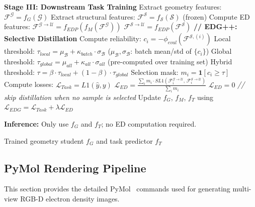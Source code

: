 \begin{algorithm}[!htb]
\begin{algorithmic}
   \STATE
   \STATE \textbf{Stage III: Downstream Task Training}
       \STATE Extract geometry features: $\mathcal{F}^{\mathcal{G}} = f_G(\mathcal{G})$
       \STATE Extract structural features: $\mathcal{F}^{\mathcal{S}} = f_{\mathcal{S}}(\mathcal{S})$ (frozen)
       \STATE Compute ED features: $\mathcal{F}^{\mathcal{G}\rightarrow\mathcal{U}} = f_{EDP}(f_M(\mathcal{F}^{\mathcal{G}}))$
       \STATE \quad\quad\quad\quad\quad\quad\quad $\mathcal{F}^{\mathcal{S}\rightarrow\mathcal{U}} = f_{EDP}(\mathcal{F}^{\mathcal{S}})$
       \STATE
       \STATE \textbf{// EDG++: Selective Distillation}
       \STATE Compute reliability: $c_i = -\phi_{eval}(\mathcal{F}^{\mathcal{S},(i)})$
       \STATE Local threshold: $\tau_{local} = \mu_{\mathcal{B}} + \kappa_{batch} \cdot \sigma_{\mathcal{B}}$ \quad ($\mu_{\mathcal{B}}, \sigma_{\mathcal{B}}$: batch mean/std of $\{c_i\}$)
       \STATE Global threshold: $\tau_{global} = \mu_{all} + \kappa_{all} \cdot \sigma_{all}$ \quad (pre-computed over training set)
       \STATE Hybrid threshold: $\tau = \beta \cdot \tau_{local} + (1-\beta) \cdot \tau_{global}$
       \STATE Selection mask: $m_i = \mathbf{1}[c_i \geq \tau]$
       \STATE
       \STATE Compute losses:
       \STATE \quad $\mathcal{L}_{Task} = L1(\hat{y}, y)$
           \STATE \quad $\mathcal{L}_{ED} = \frac{\sum_i m_i \cdot SL1(\mathcal{F}^{\mathcal{G}\!\rightarrow\!\mathcal{U}}_i,\, \mathcal{F}^{\mathcal{S}\!\rightarrow\!\mathcal{U}}_i)}{\sum_i m_i}$
       \ELSE
           \STATE \quad $\mathcal{L}_{ED} = 0$ \quad \textit{// skip distillation when no sample is selected}
       \ENDIF
       \STATE Update $f_G$, $f_M$, $f_T$ using $\mathcal{L}_{EDG} = \mathcal{L}_{Task} + \lambda \mathcal{L}_{ED}$
   \ENDFOR

   \STATE
   \STATE \textbf{Inference:} Only use $f_G$ and $f_T$; no ED computation required.

   \RETURN Trained geometry student $f_G$ and task predictor $f_T$
\end{algorithmic}
\end{algorithm}


\subsection{PyMol Rendering Pipeline}
\label{sec:appendix_pymol}

This section provides the detailed PyMol~\cite{delano2002pymol} commands used for generating multi-view RGB-D electron density images.

